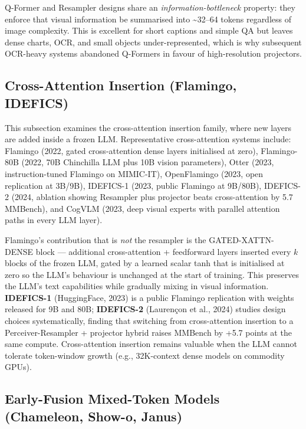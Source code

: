 Q-Former and Resampler designs share an \emph{information-bottleneck} property: they enforce that visual information be summarised into \textasciitilde32--64 tokens regardless of image complexity. This is excellent for short captions and simple QA but leaves dense charts, OCR, and small objects under-represented, which is why subsequent OCR-heavy systems abandoned Q-Formers in favour of high-resolution projectors.

\subsection{Cross-Attention Insertion (Flamingo, IDEFICS)}\label{cross-attention-insertion-flamingo-idefics}

This subsection examines the cross-attention insertion family, where new layers are added inside a frozen LLM. Representative cross-attention systems include: Flamingo (2022, gated cross-attention dense layers initialised at zero), Flamingo-80B (2022, 70B Chinchilla LLM plus 10B vision parameters), Otter (2023, instruction-tuned Flamingo on MIMIC-IT), OpenFlamingo (2023, open replication at 3B/9B), IDEFICS-1 (2023, public Flamingo at 9B/80B), IDEFICS-2 (2024, ablation showing Resampler plus projector beats cross-attention by 5.7 MMBench), and CogVLM (2023, deep visual experts with parallel attention paths in every LLM layer).

Flamingo's contribution that is \emph{not} the resampler is the GATED-XATTN-DENSE block --- additional cross-attention + feedforward layers inserted every \(k\) blocks of the frozen LLM, gated by a learned scalar tanh that is initialised at zero so the LLM's behaviour is unchanged at the start of training. This preserves the LLM's text capabilities while gradually mixing in visual information. \textbf{IDEFICS-1} (HuggingFace, 2023) is a public Flamingo replication with weights released for 9B and 80B; \textbf{IDEFICS-2} (Laurençon et al., 2024) studies design choices systematically, finding that switching from cross-attention insertion to a Perceiver-Resampler + projector hybrid raises MMBench by +5.7 points at the same compute. Cross-attention insertion remains valuable when the LLM cannot tolerate token-window growth (e.g., 32K-context dense models on commodity GPUs).

\subsection{Early-Fusion Mixed-Token Models (Chameleon, Show-o, Janus)}\label{early-fusion-mixed-token-models-chameleon-show-o-janus}

